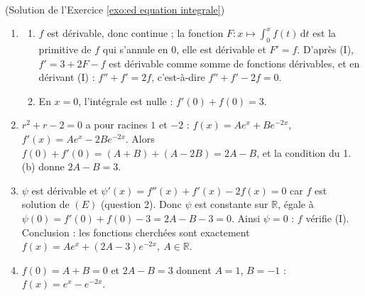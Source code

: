 \begin{corrige}
\begin{sol} ~ \\
(Solution de l'Exercice \ref{exo:ed equation integrale})
\begin{enumerate}
\item \begin{enumerate}
      \item $f$ est d\'erivable, donc continue ; la fonction $F : x \mapsto \int_0^x f(t)\,\mathrm{d}t$ est la primitive de $f$
            qui s'annule en $0$, elle est d\'erivable et $F' = f$. D'apr\`es (I), $f' = 3 + 2F - f$ est
            d\'erivable comme somme de fonctions d\'erivables, et en d\'erivant (I) : $f'' + f' = 2f$,
            c'est-\`a-dire $f'' + f' - 2f = 0$.
      \item En $x = 0$, l'int\'egrale est nulle : $f'(0) + f(0) = 3$.
      \end{enumerate}
\item $r^2 + r - 2 = 0$ a pour racines $1$ et $-2$ : $f(x) = A e^{x} + B e^{-2x}$, $f'(x) = A e^{x} - 2B e^{-2x}$.
      Alors $f(0) + f'(0) = (A + B) + (A - 2B) = 2A - B$, et la condition du 1.(b) donne $2A - B = 3$.
\item $\psi$ est d\'erivable et $\psi'(x) = f''(x) + f'(x) - 2f(x) = 0$ car $f$ est solution de $(E)$ (question 2).
      Donc $\psi$ est constante sur $\mathbb{R}$, \'egale \`a $\psi(0) = f'(0) + f(0) - 3 = 2A - B - 3 = 0$.
      Ainsi $\psi = 0$ : $f$ v\'erifie (I). Conclusion : les fonctions cherch\'ees sont exactement
      $\boxed{f(x) = A e^{x} + (2A - 3) e^{-2x}, \ A \in \mathbb{R}}$.
\item $f(0) = A + B = 0$ et $2A - B = 3$ donnent $A = 1$, $B = -1$ : $f(x) = e^{x} - e^{-2x}$.
\end{enumerate}
\end{sol}
\end{corrige}
